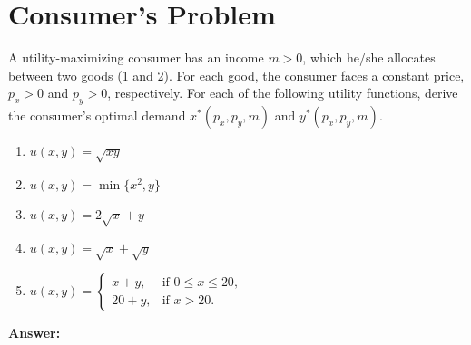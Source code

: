\documentclass[12pt,a4paper]{article}
\begin{document}
\maketitle

\section{Consumer's Problem}
A utility-maximizing consumer has an income \(m>0\), which he/she allocates between two goods (1 and 2). For each good, the consumer faces a constant price, \(p_x>0\) and \(p_y>0\), respectively. For each of the following utility functions, derive the consumer's optimal demand \(x^*(p_x,p_y,m)\) and \(y^*(p_x,p_y,m)\).

\begin{enumerate}[label=(\arabic*)]
  \item \(u(x,y)=\sqrt{xy}\)
  \item \(u(x,y)=\min\{x^2,y\}\)
  \item \(u(x,y)=2\sqrt{x}+y\)
  \item \(u(x,y)=\sqrt{x}+\sqrt{y}\)
  \item \(u(x,y)=
    \begin{cases}
        x+y, & \text{if } 0\le x\le 20, \\
        20+y, & \text{if } x>20.
    \end{cases}\)
\end{enumerate}

\vspace{0.5cm}
\noindent\textbf{Answer: }
\end{document}
